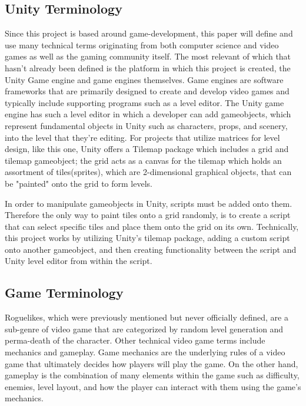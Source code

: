 \documentclass[10pt,twocolumn]{article}
\begin{document}
\subsection{Unity Terminology}

Since this project is based around game-development, this paper will define and use many technical terms originating from both computer science and video games as well as the gaming community itself. The most relevant of which that hasn't already been defined is the platform in which this project is created, the Unity Game engine and game engines themselves. Game engines are software frameworks that are primarily designed to create and develop video games and typically include supporting programs such as a level editor\cite{valencia2016technologies}. The Unity game engine has such a level editor in which a developer can add gameobjects, which represent fundamental objects in Unity such as characters, props, and scenery, into the level that they're editing. For projects that utilize matrices for level design, like this one, Unity offers a Tilemap package which includes a grid and tilemap gameobject; the grid acts as a canvas for the tilemap which holds an assortment of tiles(sprites), which are 2-dimensional graphical objects, that can be "painted" onto the grid to form levels. 

In order to manipulate gameobjects in Unity, scripts must be added onto them. Therefore the only way to paint tiles onto a grid randomly, is to create a script that can select specific tiles and place them onto the grid on its own. Technically, this project works by utilizing Unity's tilemap package, adding a custom script onto another gameobject, and then creating functionality between the script and Unity level editor from within the script. 

\subsection{Game Terminology}

Roguelikes, which were previously mentioned but never officially defined, are a sub-genre of video game that are categorized by random level generation and perma-death of the character. Other technical video game terms include mechanics and gameplay. Game mechanics are the underlying rules of a video game that ultimately decides how players will play the game\cite{boller2013learning}. On the other hand, gameplay is the combination of many elements within the game such as difficulty, enemies, level layout, and how the player can interact with them using the game's mechanics\cite{tyler2023what}.
\end{document}
